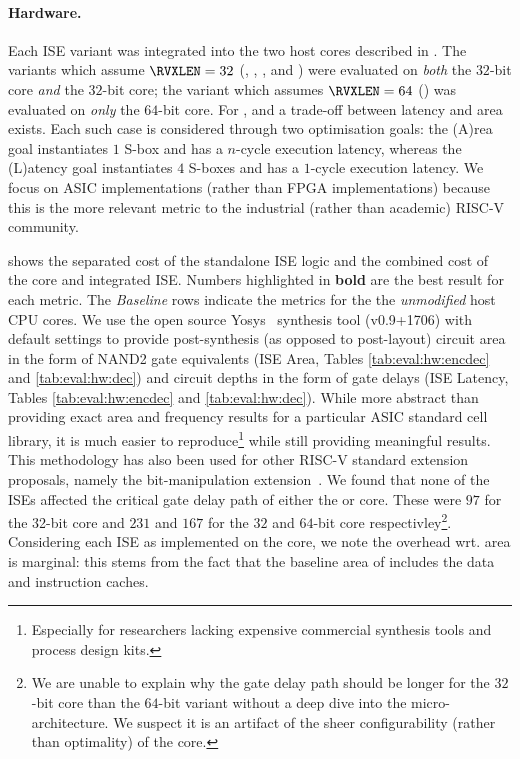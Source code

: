 
\paragraph{Hardware.}
\label{sec:ise:eval:hw}

Each ISE variant was integrated into the two host cores 
described in .
The variants which assume  $\RVXLEN = 32$
(, , , and ) 
were evaluated
on {\em both} the
$32$-bit  core
{\em  and} the
$32$-bit  core;
the variant  which assumes $\RVXLEN = 64$
()
was  evaluated
on {\em only} the
$64$-bit  core.
For ,  and  a trade-off
between latency and area exists. 
Each such case is considered through two optimisation goals:
the (A)rea    goal
instantiates $1$ S-box   and has a $n$-cycle execution latency,
whereas
the (L)atency goal
instantiates $4$ S-boxes and has a $1$-cycle execution latency.
We focus on ASIC implementations (rather than FPGA implementations)
because this is the more relevant metric to the industrial (rather than
academic) RISC-V community.

shows the separated cost of the standalone ISE logic and the
combined cost of the core and integrated ISE.
Numbers highlighted in {\bf bold} are the best result for each metric.
The {\em Baseline} rows indicate the metrics for the the
{\em unmodified} host CPU cores.
We use the open source Yosys~\cite{yosys} synthesis tool (v0.9+1706)
with default settings
to provide post-synthesis (as opposed to post-layout) circuit area in the
form of NAND2 gate equivalents
(ISE Area, Tables \ref{tab:eval:hw:encdec} and \ref{tab:eval:hw:dec})
and circuit depths
in the form of gate delays
(ISE Latency, Tables \ref{tab:eval:hw:encdec} and \ref{tab:eval:hw:dec}).
While more abstract than providing exact area and
frequency results for a particular ASIC standard cell library, it is
much easier to reproduce\footnote{
Especially
for researchers lacking expensive commercial
synthesis tools and process design kits.
} while still providing meaningful results.
This methodology has also been used for other RISC-V standard extension
proposals, namely the bit-manipulation extension~\cite[Section 3.1, Page 54]{riscv:bitmanip:draft}.
We found 
that none of the ISEs affected the critical gate delay path of either the
 or  core.
These were $97$ for the 32-bit  core and $231$ and $167$ for the
$32$ and $64$-bit  core respectivley\footnote{
We are unable to explain why the gate delay path should be longer for
the $32$-bit  core than the $64$-bit variant without a deep dive
into the micro-architecture. We suspect it is an artifact of the sheer
configurability (rather than optimality) of the  core.
}.
Considering each ISE as implemented on the  core, we note the 
overhead wrt. area is marginal: this stems from the fact that the 
baseline area of  includes the data and instruction caches.


